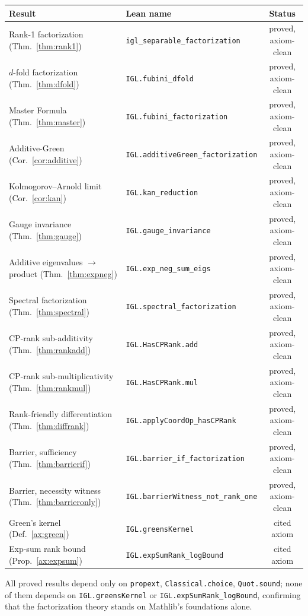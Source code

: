 \documentclass[11pt]{article}
\theoremstyle{definition}
\theoremstyle{remark}
\newcommand{\leanname}[1]{\texttt{#1}}
\newcommand{\proved}{\textcolor{green!55!black}{\textsf{proved, axiom-clean}}}
\newcommand{\cited}{\textcolor{orange!85!black}{\textsf{cited axiom}}}
\begin{document}
\begin{center}
\renewcommand{\arraystretch}{1.25}
\begin{tabular}{@{}llc@{}}
\toprule
\textbf{Result} & \textbf{Lean name} & \textbf{Status}\\
\midrule
Rank-1 factorization (Thm.~\ref{thm:rank1})         & \leanname{igl\_separable\_factorization} & \proved\\
$d$-fold factorization (Thm.~\ref{thm:dfold})       & \leanname{IGL.fubini\_dfold}             & \proved\\
Master Formula (Thm.~\ref{thm:master})              & \leanname{IGL.fubini\_factorization}    & \proved\\
Additive-Green (Cor.~\ref{cor:additive})            & \leanname{IGL.additiveGreen\_factorization} & \proved\\
Kolmogorov--Arnold limit (Cor.~\ref{cor:kan})       & \leanname{IGL.kan\_reduction}           & \proved\\
Gauge invariance (Thm.~\ref{thm:gauge})             & \leanname{IGL.gauge\_invariance}        & \proved\\
Additive eigenvalues $\to$ product (Thm.~\ref{thm:expneg}) & \leanname{IGL.exp\_neg\_sum\_eigs} & \proved\\
Spectral factorization (Thm.~\ref{thm:spectral})    & \leanname{IGL.spectral\_factorization}  & \proved\\
CP-rank sub-additivity (Thm.~\ref{thm:rankadd})     & \leanname{IGL.HasCPRank.add}            & \proved\\
CP-rank sub-multiplicativity (Thm.~\ref{thm:rankmul}) & \leanname{IGL.HasCPRank.mul}          & \proved\\
Rank-friendly differentiation (Thm.~\ref{thm:diffrank}) & \leanname{IGL.applyCoordOp\_hasCPRank} & \proved\\
Barrier, sufficiency (Thm.~\ref{thm:barrierif})     & \leanname{IGL.barrier\_if\_factorization} & \proved\\
Barrier, necessity witness (Thm.~\ref{thm:barrieronly}) & \leanname{IGL.barrierWitness\_not\_rank\_one} & \proved\\
Green's kernel (Def.~\ref{ax:green})                & \leanname{IGL.greensKernel}             & \cited\\
Exp-sum rank bound (Prop.~\ref{ax:expsum})          & \leanname{IGL.expSumRank\_logBound}     & \cited\\
\bottomrule
\end{tabular}
\end{center}

\noindent
All proved results depend only on \leanname{propext}, \leanname{Classical.choice},
\leanname{Quot.sound}; none of them depends on \leanname{IGL.greensKernel} or
\leanname{IGL.expSumRank\_logBound}, confirming that the factorization theory stands on
Mathlib's foundations alone.
\end{document}
